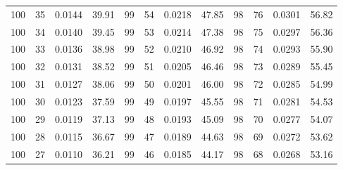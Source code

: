 \begin{tabular}{llll|llll|llll}
100 & 35 & 0.0144 & 39.91 & 99 & 54 & 0.0218 & 47.85 & 98 & 76 & 0.0301 & 56.82\\
100 & 34 & 0.0140 & 39.45 & 99 & 53 & 0.0214 & 47.38 & 98 & 75 & 0.0297 & 56.36\\
100 & 33 & 0.0136 & 38.98 & 99 & 52 & 0.0210 & 46.92 & 98 & 74 & 0.0293 & 55.90\\
100 & 32 & 0.0131 & 38.52 & 99 & 51 & 0.0205 & 46.46 & 98 & 73 & 0.0289 & 55.45\\
100 & 31 & 0.0127 & 38.06 & 99 & 50 & 0.0201 & 46.00 & 98 & 72 & 0.0285 & 54.99\\
100 & 30 & 0.0123 & 37.59 & 99 & 49 & 0.0197 & 45.55 & 98 & 71 & 0.0281 & 54.53\\
100 & 29 & 0.0119 & 37.13 & 99 & 48 & 0.0193 & 45.09 & 98 & 70 & 0.0277 & 54.07\\
100 & 28 & 0.0115 & 36.67 & 99 & 47 & 0.0189 & 44.63 & 98 & 69 & 0.0272 & 53.62\\
100 & 27 & 0.0110 & 36.21 & 99 & 46 & 0.0185 & 44.17 & 98 & 68 & 0.0268 & 53.16\\
\bottomrule
\end{tabular}
\newpage

